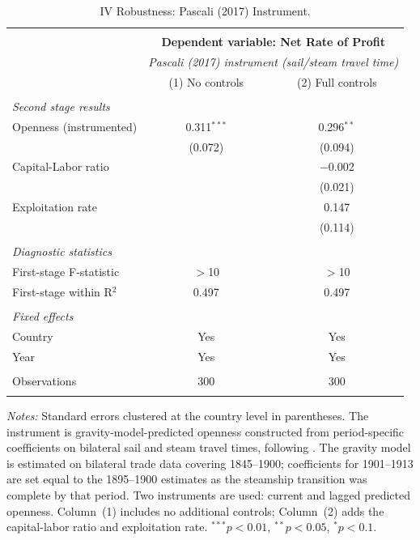 \documentclass[10pt]{article}
\begin{document}
\begin{table}[!htbp]
  \centering
  \small
  \caption{IV Robustness: Pascali (2017) Instrument.}
  \label{table:iv_pascali}
  \begin{tabular}{@{\extracolsep{5pt}}lcc}
  \\[-1.8ex]\hline
  \hline \\[-1.8ex]
  & \multicolumn{2}{c}{\textbf{Dependent variable: Net Rate of Profit}} \\
  & \multicolumn{2}{c}{\textit{Pascali (2017) instrument (sail/steam travel time)}} \\
  & (1) No controls & (2) Full controls \\
  \hline \\[-1.8ex]
  \textit{Second stage results} & & \\
  \quad Openness (instrumented) & 0.311$^{***}$ & 0.296$^{**}$ \\
  & (0.072) & (0.094) \\
  \quad Capital-Labor ratio & & $-$0.002 \\
  & & (0.021) \\
  \quad Exploitation rate & & 0.147 \\
  & & (0.114) \\
  \\
  \textit{Diagnostic statistics} & & \\
  \quad First-stage F-statistic & $>$10 & $>$10 \\
  \quad First-stage within R$^{2}$ & 0.497 & 0.497 \\
  \\
  \textit{Fixed effects} & & \\
  \quad Country & Yes & Yes \\
  \quad Year & Yes & Yes \\
  \\
  Observations & 300 & 300 \\
  \hline
  \hline \\[-1.8ex]
  \end{tabular}
  \begin{minipage}{\textwidth}
  \footnotesize
  \textit{Notes:} Standard errors clustered at the country level in parentheses. The instrument is gravity-model-predicted openness constructed from period-specific coefficients on bilateral sail and steam travel times, following \citet{Pascali2017}. The gravity model is estimated on bilateral trade data covering 1845--1900; coefficients for 1901--1913 are set equal to the 1895--1900 estimates as the steamship transition was complete by that period. Two instruments are used: current and lagged predicted openness. Column~(1) includes no additional controls; Column~(2) adds the capital-labor ratio and exploitation rate. $^{***}p<0.01$, $^{**}p<0.05$, $^{*}p<0.1$.
  \end{minipage}
\end{table}
\end{document}
